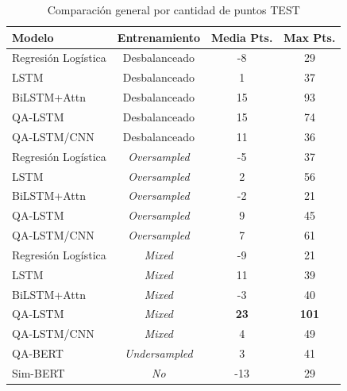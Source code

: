 \begin{table}[!tb]
  \begin{center}
    \caption{Comparación general por cantidad de puntos TEST}
    \begin{tabular}{l|c|c|c}
      \textbf{Modelo} & \textbf{Entrenamiento} & \textbf{Media Pts.} & \textbf{Max Pts.}\\
      \hline
      Regresión Logística & Desbalanceado & -8 & 29 \\
      LSTM & Desbalanceado & 1 & 37 \\
      BiLSTM+Attn & Desbalanceado & 15 & 93 \\
      QA-LSTM & Desbalanceado & 15 & 74 \\
      QA-LSTM/CNN & Desbalanceado & 11 & 36 \\

      Regresión Logística & \textit{Oversampled} & -5 & 37 \\
      LSTM & \textit{Oversampled} & 2 & 56 \\
      BiLSTM+Attn & \textit{Oversampled} & -2 & 21 \\
      QA-LSTM & \textit{Oversampled} & 9 & 45 \\
      QA-LSTM/CNN & \textit{Oversampled} & 7 & 61 \\

      Regresión Logística & \textit{Mixed} & -9 & 21 \\
      LSTM & \textit{Mixed} & 11 & 39 \\
      BiLSTM+Attn & \textit{Mixed} & -3 & 40 \\
      QA-LSTM & \textit{Mixed} & \textbf{23} & \textbf{101} \\
      QA-LSTM/CNN & \textit{Mixed} & 4 & 49 \\

      QA-BERT & \textit{Undersampled} & 3 & 41 \\
      Sim-BERT & \textit{No} & -13 & 29 \\
    \end{tabular}
  \end{center}
  \label{comparison_points_general}
\end{table}


